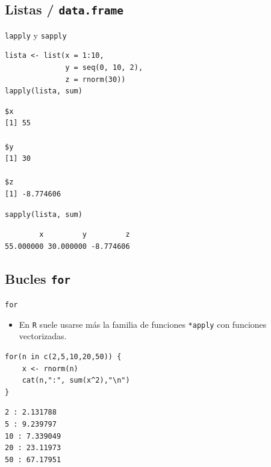 \documentclass[xcolor={usenames,svgnames,dvipsnames}]{beamer}
\begin{document}
\subsection{Listas / \texttt{data.frame}}
\label{sec:orgheadline58}
\begin{frame}[fragile,label={sec:orgheadline57}]{\texttt{lapply} y \texttt{sapply}}
 \lstset{language=R,label= ,caption= ,captionpos=b,numbers=none}
\begin{lstlisting}
lista <- list(x = 1:10,
              y = seq(0, 10, 2),
              z = rnorm(30))
lapply(lista, sum)
\end{lstlisting}

\begin{verbatim}
$x
[1] 55

$y
[1] 30

$z
[1] -8.774606
\end{verbatim}

\lstset{language=R,label= ,caption= ,captionpos=b,numbers=none}
\begin{lstlisting}
sapply(lista, sum)
\end{lstlisting}

\begin{verbatim}
        x         y         z 
55.000000 30.000000 -8.774606
\end{verbatim}
\end{frame}

\subsection{Bucles \texttt{for}}
\label{sec:orgheadline60}
\begin{frame}[fragile,label={sec:orgheadline59}]{\texttt{for}}
 \begin{itemize}
\item En \texttt{R} suele usarse más la familia de funciones \texttt{*apply} con funciones vectorizadas.
\end{itemize}
\lstset{language=R,label= ,caption= ,captionpos=b,numbers=none}
\begin{lstlisting}
for(n in c(2,5,10,20,50)) {
    x <- rnorm(n)
    cat(n,":", sum(x^2),"\n")
}
\end{lstlisting}

\begin{verbatim}
2 : 2.131788 
5 : 9.239797 
10 : 7.339049 
20 : 23.11973 
50 : 67.17951
\end{verbatim}
\end{frame}
\end{document}
